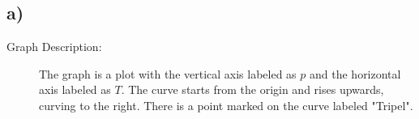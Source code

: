 

\subsection*{a)}

\begin{description}
    \item[Graph Description:] The graph is a plot with the vertical axis labeled as \( p \) and the horizontal axis labeled as \( T \). The curve starts from the origin and rises upwards, curving to the right. There is a point marked on the curve labeled "Tripel".
\end{description}